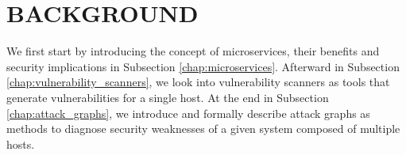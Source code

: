 \section{BACKGROUND}
\label{chap:background}

We first start by introducing the concept of microservices, their benefits and security implications in Subsection \ref{chap:microservices}. Afterward in Subsection \ref{chap:vulnerability_scanners}, we look into vulnerability scanners as tools that generate vulnerabilities for a single host. At the end in Subsection \ref{chap:attack_graphs}, we introduce and formally describe attack graphs as methods to diagnose security weaknesses of a given system composed of multiple hosts.





